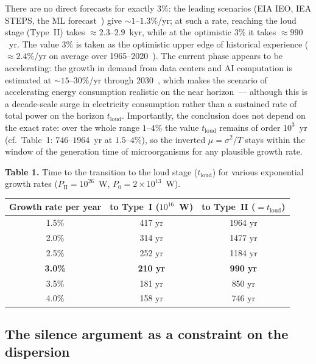 \documentclass[11pt,a4paper]{article}
\begin{document}
\medskip
There are no direct forecasts for exactly $3\%$: the leading scenarios (EIA IEO, IEA STEPS, the ML forecast~\cite{Zhang2023}) give $\sim 1$--$1.3\%$/yr; at such a rate, reaching the loud stage (Type~II) takes $\approx 2.3$--$2.9$~kyr, while at the optimistic $3\%$ it takes $\approx 990$~yr. The value $3\%$ is taken as the optimistic upper edge of historical experience ($\approx 2.4\%$/yr on average over 1965--2020~\cite{Smil2017,EI2024}). The current phase appears to be accelerating: the growth in demand from data centers and AI computation is estimated at $\sim 15$--$30\%$/yr through 2030~\cite{IEA2025AI}, which makes the scenario of accelerating energy consumption realistic on the near horizon~--- although this is a decade-scale surge in electricity consumption rather than a sustained rate of total power on the horizon $t_{\mathrm{loud}}$. Importantly, the conclusion does not depend on the exact rate: over the whole range $1$--$4\%$ the value $t_{\mathrm{loud}}$ remains of order $10^3$~yr (cf.\ Table~1: $746$--$1964$~yr at $1.5$--$4\%$), so the inverted $\mu = \sigma^2/T$ stays within the window of the generation time of microorganisms for any plausible growth rate.

\begin{center}
\textbf{Table 1.} Time to the transition to the loud stage ($t_{\mathrm{loud}}$) for various exponential growth rates ($P_{\mathrm{II}} = 10^{26}$~W, $P_0 = 2 \times 10^{13}$~W).

\medskip
\begin{tabular}{ccc}
\toprule
Growth rate per year & to Type~I ($10^{16}$~W) & to Type~II ($= t_{\mathrm{loud}}$) \\
\midrule
1.5\% & 417 yr & 1964 yr \\
2.0\% & 314 yr & 1477 yr \\
2.5\% & 252 yr & 1184 yr \\
\textbf{3.0\%} & \textbf{210 yr} & \textbf{990 yr} \\
3.5\% & 181 yr & 850 yr \\
4.0\% & 158 yr & 746 yr \\
\bottomrule
\end{tabular}
\end{center}

\subsection{The silence argument as a constraint on the dispersion}
\label{sec:silence_sigma}
\end{document}
